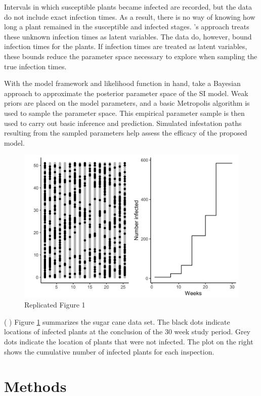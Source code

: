 \documentclass{uwstat572}
\newcommand{\vmcomment}[1]{({\color{blue}{VM's comment:}} \textbf{\color{blue}{#1}})}
\begin{document}
Intervals in which susceptible plants became infected are recorded, but the data do not include exact infection times.  
As a result, there is no way of knowing how long a plant remained in the susceptible and infected stages.
\cite{Brown}'s approach treats these unknown infection times as latent variables.
The data do, however, bound infection times for the plants.
If infection times are treated as latent variables, these bounds reduce the parameter space necessary to explore when sampling the true infection times. 

With the model framework and likelihood function in hand, \cite{Brown} take a Bayesian approach to approximate the posterior parameter space of the SI model. 
Weak priors are placed on the model parameters, and a basic Metropolis algorithm is used to sample the parameter space. 
This empirical parameter sample is then used to carry out basic inference and prediction. 
Simulated infestation paths resulting from the sampled parameters help assess the efficacy of the proposed model. 

\begin{figure}[H]
\centering
\includegraphics[height=0.45\linewidth, keepaspectratio]{figures/figure_1.png}
\caption{Replicated Figure 1}
   \label{fig:data_plot}
\end{figure}

\vmcomment{Add axis labels to the left plot: ``grid dimension 1" and ``grid dimension 2".} 
Figure \ref{fig:data_plot} summarizes the sugar cane data set. The black dots indicate locations of infected plants at the conclusion of the 30 week study period. Grey dots indicate the location of plants that were not infected. The plot on the right shows the cumulative number of infected plants for each inspection. 

\section{Methods}
\end{document}
